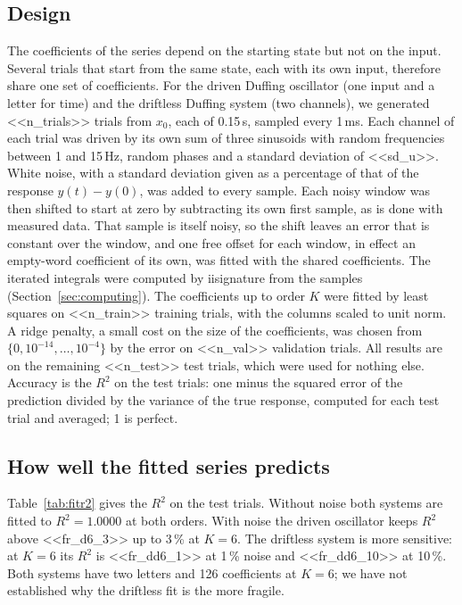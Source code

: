 \documentclass[11pt,a4paper]{article}
\theoremstyle{remark}
\begin{document}
\subsection{Design}\label{sec:regression-design}
The coefficients of the series depend on the starting state but not on the input.
Several trials that start from the same state, each with its own input, therefore share one set of coefficients.
For the driven Duffing oscillator (one input and a letter for time) and the driftless Duffing system (two channels), we generated <<n_trials>> trials from $x_0$, each of 0.15\,s, sampled every 1\,ms.
Each channel of each trial was driven by its own sum of three sinusoids with random frequencies between 1 and 15\,Hz, random phases and a standard deviation of <<sd_u>>.
White noise, with a standard deviation given as a percentage of that of the response $y(t)-y(0)$, was added to every sample.
Each noisy window was then shifted to start at zero by subtracting its own first sample, as is done with measured data.
That sample is itself noisy, so the shift leaves an error that is constant over the window, and one free offset for each window, in effect an empty-word coefficient of its own, was fitted with the shared coefficients.
The iterated integrals were computed by iisignature from the samples (Section~\ref{sec:computing}).
The coefficients up to order $K$ were fitted by least squares on <<n_train>> training trials, with the columns scaled to unit norm.
A ridge penalty, a small cost on the size of the coefficients, was chosen from $\{0,10^{-14},\dots,10^{-4}\}$ by the error on <<n_val>> validation trials.
All results are on the remaining <<n_test>> test trials, which were used for nothing else.
Accuracy is the $R^2$ on the test trials: one minus the squared error of the prediction divided by the variance of the true response, computed for each test trial and averaged; 1 is perfect.

\subsection{How well the fitted series predicts}
Table~\ref{tab:fitr2} gives the $R^2$ on the test trials.
Without noise both systems are fitted to $R^2=1.0000$ at both orders.
With noise the driven oscillator keeps $R^2$ above <<fr_d6_3>> up to 3\,\% at $K=6$.
The driftless system is more sensitive: at $K=6$ its $R^2$ is <<fr_dd6_1>> at 1\,\% noise and <<fr_dd6_10>> at 10\,\%.
Both systems have two letters and 126 coefficients at $K=6$; we have not established why the driftless fit is the more fragile.
\end{document}
